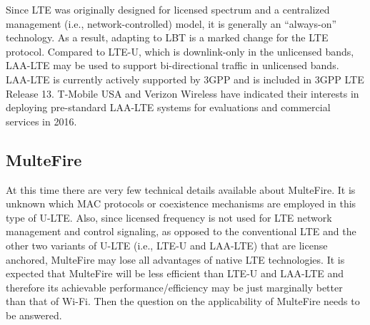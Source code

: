 Since LTE was originally designed for licensed spectrum and a centralized management (i.e., network-controlled) model, it is generally an ``always-on'' technology. As a result, adapting to LBT is a marked change for the LTE protocol. Compared to \mbox{LTE-U}, which is downlink-only in the unlicensed bands, \mbox{LAA-LTE} may be used to support bi-directional traffic in unlicensed bands. \mbox{LAA-LTE} is currently actively supported by 3GPP and is included in 3GPP LTE Release 13. T-Mobile USA and Verizon Wireless have indicated their interests in deploying pre-standard \mbox{LAA-LTE} systems for evaluations and commercial services in 2016.



\subsection{MulteFire}
At this time there are very few technical details available about MulteFire. It is unknown which MAC protocols or coexistence mechanisms are employed in this type of \mbox{U-LTE}. Also, since licensed frequency is not used for LTE network management and control signaling, as opposed to the conventional LTE and the other two variants of \mbox{U-LTE} (i.e., \mbox{LTE-U} and \mbox{LAA-LTE}) that are license anchored, MulteFire may lose all advantages of native LTE technologies. It is expected that MulteFire will be less efficient than \mbox{LTE-U} and \mbox{LAA-LTE} and therefore its achievable performance/efficiency may be just marginally better than that of \mbox{Wi-Fi}. Then the question on the applicability of MulteFire needs to be answered.


